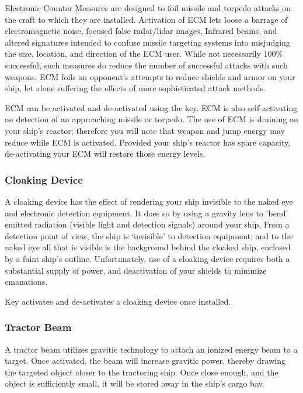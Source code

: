\documentclass{article}
\newcommand{\key}[1]{%
  \tikz[baseline=(key.base)]{
    \node[draw=gray!50, fill=gray!5, rounded corners=2pt, inner sep=2pt, minimum height=1.5ex] (key) {\footnotesize\sffamily\bfseries #1};
  }%
}
\begin{document}
Electronic Counter Measures are designed to foil missile and torpedo attacks on the craft to which they are installed. Activation of ECM lets loose a barrage of electromagnetic noise, focused false radar/lidar images, Infrared beams, and altered signatures intended to confuse missile targeting systems into misjudging the size, location, and direction of the ECM user. While not necessarily 100\% successful, such measures do reduce the number of successful attacks with such weapons. ECM foils an opponent's attempts to reduce shields and armor on your ship, let alone suffering the effects of more sophisticated attack methods. 


ECM can be activated and de-activated using the \key{e} key. ECM is also self-activating on detection of an approaching missile or torpedo. The use of ECM is draining on your ship's reactor; therefore you will note that weapon and jump energy may reduce while ECM is activated. Provided your ship's reactor has spare capacity, de-activating your ECM will restore those energy levels. 

\subsubsection{ Cloaking Device }

A cloaking device has the effect of rendering your ship invisible to the naked eye and electronic detection equipment. It does so by using a gravity lens to 'bend' emitted radiation (visible light and detection signals) around your ship. From a detection point of view, the ship is `invisible' to detection equipment; and to the naked eye all that is visible is the background behind the cloaked ship, enclosed by a faint ship's outline. Unfortunately, use of a cloaking device requires both a substantial supply of power, and deactivation of your shields to minimize emanations. 


Key \key{c} activates and de-activates a cloaking device once installed. 

\subsubsection{ Tractor Beam }

A tractor beam utilizes gravitic technology to attach an ionized energy beam to a target. Once activated, the beam will increase gravitic power, thereby drawing the targeted object closer to the tractoring ship. Once close enough, and the object is sufficiently small, it will be stored away in the ship's cargo bay. 
\end{document}
